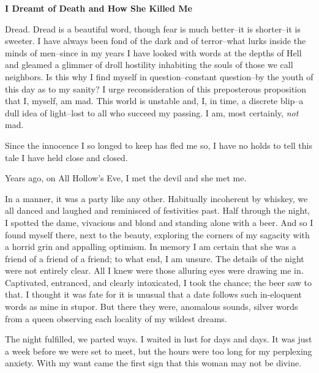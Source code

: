\documentclass{article}
\begin{document}


\begin{center}
\large\textbf{I Dreamt of Death and How She Killed Me}
\end{center}


\noindent
Dread.
Dread is a beautiful word,
though fear is much better--it is shorter--it is sweeter.
I have always been fond of the dark and of terror--what
lurks inside the minds of men--since in my years
I have looked with words at the depths of Hell
and gleamed a glimmer of droll hostility
inhabiting the souls of those we call neighbors.
Is this why I find myself in question--constant question--by
the youth of this day as to my sanity?
I urge reconsideration of this preposterous proposition that
I, myself, am mad.
This world is unstable and, I, in time, a discrete blip--a
dull idea of light--lost to all who succeed my passing.
I am, most certainly, \textit{not} mad.
\VV


\noindent %
Since the innocence I so longed to keep has fled me so,
I have no holds to tell this tale I have held close and closed.
\VV


\noindent
Years ago, on All Hollow's Eve,
I met the devil and she met me.
\VV


\noindent
In a manner, it was a party like any other.
Habitually incoherent by whiskey,
we all danced and laughed and reminisced of festivities past.
Half through the night, I spotted the dame,
vivacious and blond and standing alone with a beer.
And so I found myself there, next to the beauty,
exploring the corners of my sagacity with a horrid
grin and appalling optimism.
In memory I am certain that she was a friend of
a friend of a friend; to what end, I am unsure.
The details of the night were not entirely clear.
All I knew were those alluring eyes were drawing me in.
Captivated, entranced, and clearly intoxicated,
I took the chance; the beer saw to that.
I thought it was fate for it is unusual
that a date follows such in-eloquent words
as mine in stupor.
But there they were, anomalous sounds,
silver words from a queen observing each
locality of my wildest dreams.


The night fulfilled, we parted ways.
I waited in lust for days and days.
It was just a week before we were set to meet,
but the hours were too long for my perplexing anxiety.
With my want came the first sign that this woman may not be divine.
\end{document}
